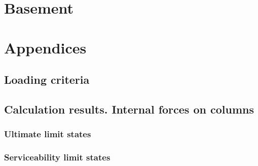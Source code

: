 \section{Basement}


\newpage
\appendix
\section*{Appendices}
\renewcommand{\thesubsection}{\Alph{subsection}}

\subsection{Loading criteria} \label{loadCrit}


\newpage
\subsection{Calculation results. Internal forces on columns}\label{sc_column_internal_forces}
\subsubsection{Ultimate limit states}

\clearpage
\newpage
\subsubsection{Serviceability limit states}


